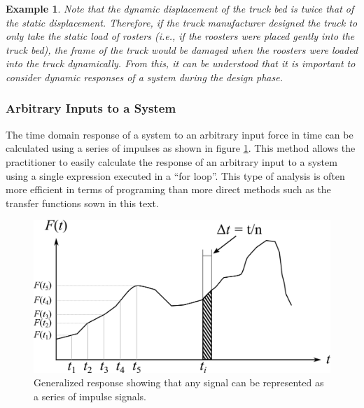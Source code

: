 \documentclass[12pt,letter]{article}
\newtheorem{ex}{Example}
\numberwithin{ex}{section} %
\newenvironment{example}{\begin{mdframed}[middlelinewidth=0.5mm]\begin{ex}\normalfont}{\end{ex}\end{mdframed}}
\numberwithin{re}{section} %
\begin{document}
\begin{example}
Note that the dynamic displacement of the truck bed is twice that of the static displacement. Therefore, if the truck manufacturer designed the truck to only take the static load of rosters (i.e., if the roosters were placed gently into the truck bed), the frame of the truck would be damaged when the roosters were loaded into the truck dynamically. From this, it can be understood that it is important to consider dynamic responses of a system during the design phase.


\end{example}

\subsubsection{Arbitrary Inputs to a System}
\label{sec:impulse_inputs}
The time domain response of a system to an arbitrary input force in time can be calculated using a series of impulses as shown in figure \ref{fig:Arbitary_excitation_forces}. This method allows the practitioner to easily calculate the response of an arbitrary input to a system using a single expression executed in a ``for loop''. This type of analysis is often more efficient in terms of programing than more direct methods such as the transfer functions sown in this text. 

\begin{figure}[H]
	\centering
	\includegraphics[]{../Figures/Arbitary_excitation_forces.png}
	\caption{Generalized response showing that any signal can be represented as a series of impulse signals. }
	\label{fig:Arbitary_excitation_forces}
\end{figure}
\end{document}
